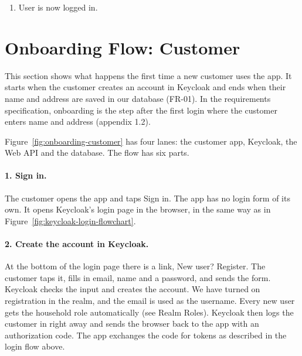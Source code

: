 \documentclass[a4paper,11pt]{article}
\begin{document}
\begin{enumerate}
    Then the Client registers a function with the api-client that returns the current access token. The effect of this, is that before every request the api-client calls that function and can therefore add a non-expired token to the http request.
        \begin{itemize}
            \item admin-panel: All three tokens are kept in the browsers memory and are lost when the page is reloaded. Admin has to click 'log in' again.
            \item mobile-app: access token and ID token are kept in memory and are lost when the app is closed. The refresh token is saved to persistent storage on the phone, so the user stays signed in when reopening the app.
        \end{itemize}
    \item User is now logged in.
\end{enumerate}

\section{Onboarding Flow: Customer}\label{sec:onboarding-customer}
This section shows what happens the first time a new customer uses the app. It starts when the customer creates an account in Keycloak and ends when their name and address are saved in our database (FR-01). In the requirements specification, onboarding is the step after the first login where the customer enters name and address (appendix 1.2).


Figure~\ref{fig:onboarding-customer} has four lanes: the customer app, Keycloak, the Web API and the database. The flow has six parts.

\paragraph{1. Sign in.} The customer opens the app and taps Sign in. The app has no login form of its own. It opens Keycloak's login page in the browser, in the same way as in Figure~\ref{fig:keycloak-login-flowchart}.

\paragraph{2. Create the account in Keycloak.} At the bottom of the login page there is a link, New user? Register. The customer taps it, fills in email, name and a password, and sends the form. Keycloak checks the input and creates the account. We have turned on registration in the realm, and the email is used as the username. Every new user gets the household role automatically (see Realm Roles). Keycloak then logs the customer in right away and sends the browser back to the app with an authorization code. The app exchanges the code for tokens as described in the login flow above.
\end{document}
